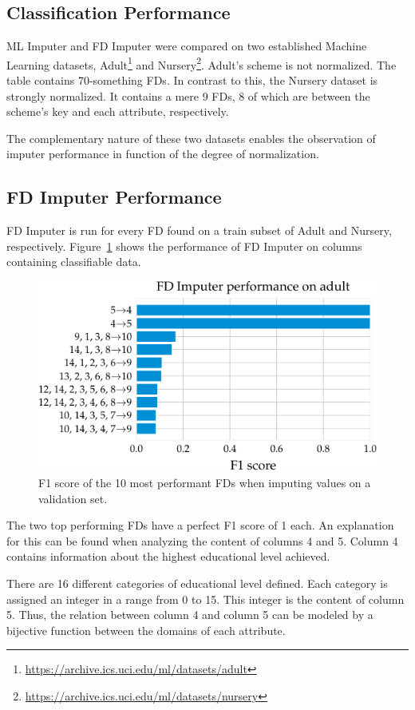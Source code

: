 \subsection{Classification Performance}
ML Imputer and FD Imputer were compared on two established Machine Learning datasets, Adult\footnote{\url{https://archive.ics.uci.edu/ml/datasets/adult}} and Nursery\footnote{\url{https://archive.ics.uci.edu/ml/datasets/nursery}}.
Adult's scheme is not normalized.
The table contains 70-something FDs.
In contrast to this, the Nursery dataset is strongly normalized.
It contains a mere 9 FDs, 8 of which are between the scheme's key and each attribute, respectively.

The complementary nature of these two datasets enables the observation of imputer performance in function of the degree of normalization.

\subsection{FD Imputer Performance}
FD Imputer is run for every FD found on a train subset of Adult and Nursery, respectively.
Figure~\ref{fig:f1_fd_adult} shows the performance of FD Imputer on columns containing classifiable data.
\begin{figure}[h]
     \centering
     \includegraphics[width=.8\textwidth]{../figures/adult/f1_fd_imputer_adult.pdf}
     \caption{F1 score of the 10 most performant FDs when imputing values on a validation set.}
     \label{fig:f1_fd_adult}
 \end{figure}
The two top performing FDs have a perfect F1 score of 1 each.
An explanation for this can be found when analyzing the content of columns 4 and 5.
Column 4 contains information about the highest educational level achieved.

There are 16 different categories of educational level defined.
Each category is assigned an integer in a range from 0 to 15.
This integer is the content of column 5.
Thus, the relation between column 4 and column 5 can be modeled by a bijective function between the domains of each attribute.


